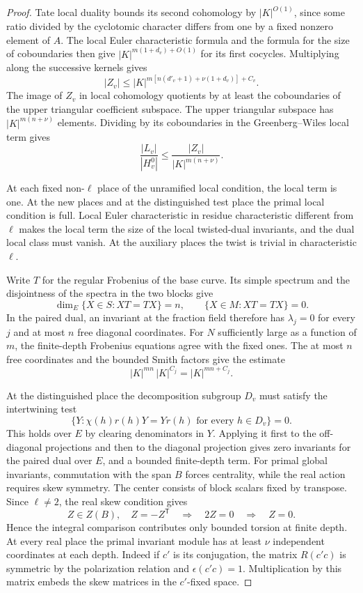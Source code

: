 \begin{proof}
Tate local duality bounds its second cohomology by
\(|K|^{O(1)}\), since some ratio divided by the
cyclotomic character differs from one by a fixed
nonzero element of \(A\). The local Euler characteristic
formula and the formula for the size of coboundaries
then give \(|K|^{m(1+d_v)+O(1)}\) for its first
cocycles. Multiplying along the successive kernels gives
\[
       |Z_v|\le
       |K|^{m[n(d'_v+1)+\nu(1+d_v)]+C_v}.
\]
The image of \(Z_v\) in local cohomology quotients
by at least the coboundaries of the upper triangular
coefficient subspace. The upper triangular subspace has \(|K|^{m(n+\nu)}\) elements. Dividing by its coboundaries in the Greenberg--Wiles local term gives 
\[
 \frac{|L_v|}{|H_v^0|}\le \frac{|Z_v|}{|K|^{m(n+\nu)}}.
\]


At each fixed non-\(\ell\) place of the unramified local
condition, the local term is one. At the new places
and at the distinguished test place the primal local
condition is full. Local Euler characteristic in
residue characteristic different from \(\ell\) makes
the local term the size of the local twisted-dual
invariants, and the dual local class must vanish.
At the auxiliary places the twist is trivial in
characteristic \(\ell\).

Write \(T\) for the regular Frobenius of the base curve. Its simple spectrum and the disjointness of the spectra in the two blocks give 
\[
 \dim_E\{X\in S:XT=TX\}=n,\qquad\{X\in M:XT=TX\}=0.
\]
 In the paired dual,
an invariant at the fraction field therefore has
\(\lambda_j=0\) for every \(j\) and at most \(n\)
free diagonal coordinates. For \(N\) sufficiently large as a function of \(m\), the finite-depth Frobenius equations agree with the fixed ones. The at most \(n\) free coordinates and the bounded Smith factors give the estimate
\[
 |K|^{mn}\,|K|^{C_j}=|K|^{mn+C_j} .
\]

At the distinguished place the decomposition subgroup \(D_v\) must satisfy the intertwining test 
\[
 \bigl\{Y:\chi(h)r(h)Y=Yr(h)\text{ for every }h\in D_v\bigr\}=0.
\]
 This holds
over \(E\) by clearing denominators in \(Y\). Applying it
first to the off-diagonal projections and then to the
diagonal projection gives zero invariants for the paired
dual over \(E\), and a bounded finite-depth term.
For primal global invariants, commutation
with the span \(B\) forces centrality, while the
real action requires skew symmetry. The center consists of block scalars fixed by transpose. Since \(\ell\ne2\), the real skew condition gives 
\[
 Z\in Z(B),\quad Z=-Z^{\mathsf T}\quad\Longrightarrow\quad 2Z=0\quad\Longrightarrow\quad Z=0.
\]
 Hence the integral comparison contributes only bounded torsion at finite depth. At every real place
the primal invariant module has at least
\(\nu\) independent coordinates at each depth.
Indeed if \(c'\) is its conjugation, the matrix
\(R(c'c)\) is symmetric by the polarization
relation and \(\epsilon(c'c)=1\). Multiplication
by this matrix embeds the skew matrices in the
\(c'\)-fixed space.


\end{proof}

